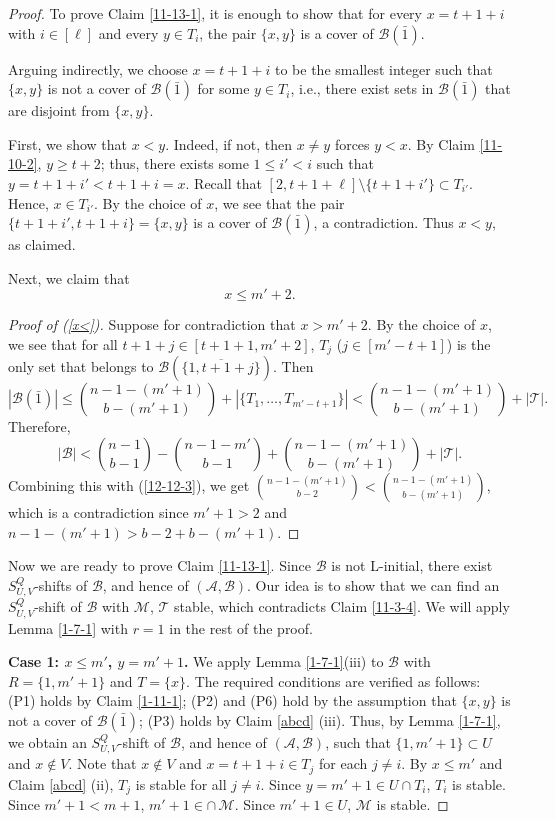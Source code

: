 \documentclass[11pt]{article}
\newcommand{\m}{\mathcal}
\begin{document}
\begin{proof}
To prove Claim \ref{11-13-1}, it is enough to show that
for every $x=t+1+i$ with $i\in[\ell]$ and every $y\in T_i$,
the pair $\{x,y\}$ is a cover of $\mathcal B(\bar1)$.

Arguing indirectly, we choose $x=t+1+i$ to be the smallest integer such that $\{x,y\}$ is not a cover of $\m B(\bar1)$ for some $y\in T_i$, i.e., there exist sets in $\m B(\bar{1})$ that are disjoint from $\{x,y\}$.

First, we show that $x<y$. Indeed, if not, then $x\ne y$ forces $y<x$. By Claim \ref{11-10-2}, $y\ge t+2$; thus, there exists some $1\le i'<i$ such that $y=t+1+i'<t+1+i=x$. 
Recall that $[2,t+1+\ell]\setminus \{t+1+i'\}\subset T_{i'}$. 
Hence, $x\in T_{i'}$. By the choice of $x$, we see that the pair $\{t+1+i', t+1+i\}=\{x,y\}$ is a cover of $\m B(\bar1)$, a contradiction. Thus $x<y$, as claimed.  

Next, we claim that
\begin{equation}\label{x<}
    x\le m'+2.
\end{equation}

\begin{proof}[Proof of (\ref{x<})]
Suppose for contradiction that $x>m'+2$. 
By the choice of $x$, we see that for all $t+1+j\in [t+1+1, m'+2]$, $T_j$ ($j\in [m'-t+1]$) is the only set that belongs to $\mathcal{B}(\overline{\{1,t+1+j\}})$.   
Then 
\begin{equation}
|\mathcal{B}(\bar{1})|\le {n-1-(m'+1)\choose b-(m'+1)}+|\{T_1, \dots, T_{m'-t+1}\}|<{n-1-(m'+1)\choose b-(m'+1)}+|\m T|.
\end{equation}
Therefore, 
\[
|\mathcal{B}|<{n-1\choose b-1}-{n-1-m'\choose b-1}+{n-1-(m'+1)\choose b-(m'+1)}+|\m T|.
\]
Combining this with (\ref{12-12-3}), we get ${n-1-(m'+1)\choose b-2}<{n-1-(m'+1)\choose b-(m'+1)}$, which is a contradiction since $m'+1>2$ and $n-1-(m'+1)>b-2+b-(m'+1)$.
\end{proof}

Now we are ready to prove Claim \ref{11-13-1}.
Since $\m B$ is not L-initial, there exist $S_{U,V}^Q$-shifts of $\m B$, and hence of $(\mathcal{A}, \mathcal{B})$. 
Our idea is to show that we can find an $S^Q_{U, V}$-shift of $\m B$ with $\mathcal{M}$, $\mathcal{T}$ stable, which contradicts Claim \ref{11-3-4}. We will apply Lemma \ref{1-7-1} with $r=1$ in the rest of the proof.

{\bf Case 1: $x\le m'$, $y=m'+1$.} 
We apply Lemma \ref{1-7-1}(iii) to $\m B$ with $R=\{1, m'+1\}$ and $T=\{x\}$. 
The required conditions are verified as follows:
 (P1) holds by Claim \ref{1-11-1}; 
(P2) and (P6) hold by the assumption that $\{x,y\}$ is not a cover of $\m B(\bar1)$; 
 (P3) holds by Claim \ref{abcd} (iii). 
 Thus, by Lemma \ref{1-7-1}, we obtain an $S_{U,V}^Q$-shift of $\m B$, and hence of $(\m A, \m B)$, such that $\{1, m'+1\}\subset U$ and $x\not\in V$. 
Note that $x\not\in V$ and $x=t+1+i \in T_j$ for each $j\ne i$. By $x\le m'$ and Claim \ref{abcd} (ii), 
$T_j$ is stable for all  $j\ne i$.  
Since $y=m'+1\in U\cap T_i$, $T_i$ is stable. 
Since $m'+1< m+1$, $m'+1\in \cap \, \m M$. 
Since $m'+1\in U$, $\m M$ is stable.


\end{proof}
\end{document}
